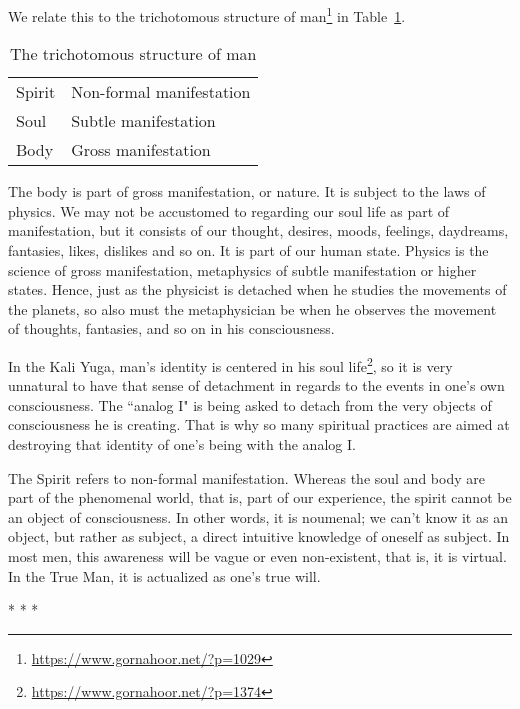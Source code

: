 We relate this to the trichotomous structure of man\footnote{\url{https://www.gornahoor.net/?p=1029}} in Table~\ref{tab:trichotomous}.

\begin{table}[h]\small\centering
\begin{tabular}{ll}\toprule
Spirit &
Non-formal manifestation\\
Soul &
Subtle manifestation\\
Body &
Gross manifestation\\\bottomrule
\end{tabular}
\caption{The trichotomous structure of man}
\label{tab:trichotomous}
\end{table}
The body is part of gross manifestation, or nature. It is subject to the laws of physics. We may not be accustomed to regarding our soul life as part of manifestation, but it consists of our thought, desires, moods, feelings, daydreams, fantasies, likes, dislikes and so on. It is part of our human state. Physics is the science of gross manifestation, metaphysics of subtle manifestation or higher states. Hence, just as the physicist is detached when he studies the movements of the planets, so also must the metaphysician be when he observes the movement of thoughts, fantasies, and so on in his consciousness.

In the Kali Yuga, man's identity is centered in his soul life\footnote{\url{https://www.gornahoor.net/?p=1374}}, so it is very unnatural to have that sense of detachment in regards to the events in one's own consciousness. The ``analog I" is being asked to detach from the very objects of consciousness he is creating. That is why so many spiritual practices are aimed at destroying that identity of one's being with the analog I.

The Spirit refers to non-formal manifestation. Whereas the soul and body are part of the phenomenal world, that is, part of our experience, the spirit cannot be an object of consciousness. In other words, it is noumenal; we can't know it as an object, but rather as subject, a direct intuitive knowledge of oneself as subject. In most men, this awareness will be vague or even non-existent, that is, it is virtual. In the True Man, it is actualized as one's true will.




\begin{center}* * *\end{center}

